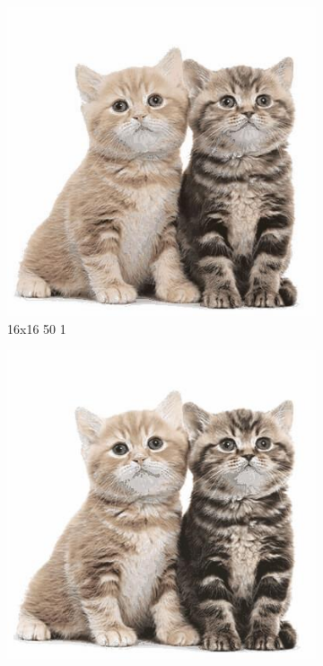 \documentclass[12pt,a4paper]{article}
\begin{document}
\begin{figure}[H]
\medskip
\begin{subfigure}{0.25\textwidth}
  \includegraphics[width=\linewidth]{images/big/16-16-50-1}
  \caption{16x16 50 1}
  \label{fig:4}
\end{subfigure}\hfil %
\begin{subfigure}{0.25\textwidth}
  \includegraphics[width=\linewidth]{images/big/16-16-100-05}

\end{subfigure}
\end{figure}
\end{document}
